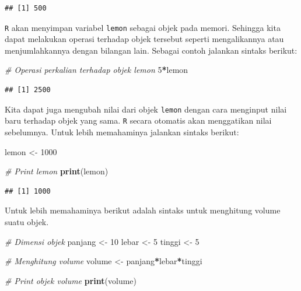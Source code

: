 \documentclass[]{book}
\newenvironment{Shaded}{\begin{snugshade}}{\end{snugshade}}
\newcommand{\CommentTok}[1]{\textcolor[rgb]{0.56,0.35,0.01}{\textit{#1}}}
\newcommand{\DecValTok}[1]{\textcolor[rgb]{0.00,0.00,0.81}{#1}}
\newcommand{\KeywordTok}[1]{\textcolor[rgb]{0.13,0.29,0.53}{\textbf{#1}}}
\newcommand{\NormalTok}[1]{#1}
\newcommand{\OperatorTok}[1]{\textcolor[rgb]{0.81,0.36,0.00}{\textbf{#1}}}
\newcommand{\StringTok}[1]{\textcolor[rgb]{0.31,0.60,0.02}{#1}}
\theoremstyle{definition}
\theoremstyle{definition}
\theoremstyle{definition}
\theoremstyle{remark}
\begin{document}
\begin{verbatim}
## [1] 500
\end{verbatim}

\texttt{R} akan menyimpan variabel \texttt{lemon} sebagai objek pada memori. Sehingga kita dapat melakukan operasi terhadap objek tersebut seperti mengalikannya atau menjumlahkannya dengan bilangan lain. Sebagai contoh jalankan sintaks berikut:

\begin{Shaded}
\begin{Highlighting}[]
\CommentTok{# Operasi perkalian terhadap objek lemon}
\DecValTok{5}\OperatorTok{*}\NormalTok{lemon}
\end{Highlighting}
\end{Shaded}

\begin{verbatim}
## [1] 2500
\end{verbatim}

Kita dapat juga mengubah nilai dari objek \texttt{lemon} dengan cara menginput nilai baru terhadap objek yang sama. \texttt{R} secara otomatis akan menggatikan nilai sebelumnya. Untuk lebih memahaminya jalankan sintaks berikut:

\begin{Shaded}
\begin{Highlighting}[]
\NormalTok{lemon <-}\StringTok{ }\DecValTok{1000}

\CommentTok{# Print lemon}
\KeywordTok{print}\NormalTok{(lemon)}
\end{Highlighting}
\end{Shaded}

\begin{verbatim}
## [1] 1000
\end{verbatim}

Untuk lebih memahaminya berikut adalah sintaks untuk menghitung volume suatu objek.

\begin{Shaded}
\begin{Highlighting}[]
\CommentTok{# Dimensi objek}
\NormalTok{panjang <-}\StringTok{ }\DecValTok{10}
\NormalTok{lebar <-}\StringTok{ }\DecValTok{5}
\NormalTok{tinggi <-}\StringTok{ }\DecValTok{5}

\CommentTok{# Menghitung volume}
\NormalTok{volume <-}\StringTok{ }\NormalTok{panjang}\OperatorTok{*}\NormalTok{lebar}\OperatorTok{*}\NormalTok{tinggi}

\CommentTok{# Print objek volume}
\KeywordTok{print}\NormalTok{(volume)}
\end{Highlighting}
\end{Shaded}
\end{document}
